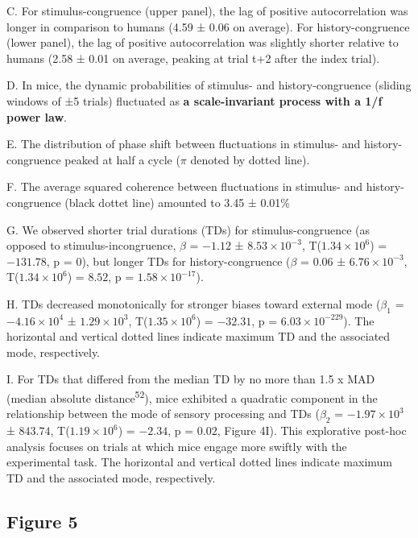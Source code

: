 \documentclass[
]{article}
\begin{document}
C. For stimulus-congruence (upper panel), the lag of positive
autocorrelation was longer in comparison to humans (4.59 ± 0.06 on
average). For history-congruence (lower panel), the lag of positive
autocorrelation was slightly shorter relative to humans (2.58 ± 0.01 on
average, peaking at trial t+2 after the index trial).

D. In mice, the dynamic probabilities of stimulus- and
history-congruence (sliding windows of ±5 trials) fluctuated as
\textbf{a scale-invariant process with a 1/f power law}.

E. The distribution of phase shift between fluctuations in stimulus- and
history-congruence peaked at half a cycle (\(\pi\) denoted by dotted
line).

F. The average squared coherence between fluctuations in stimulus- and
history-congruence (black dottet line) amounted to 3.45 ± 0.01\%

G. We observed shorter trial durations (TDs) for stimulus-congruence (as
opposed to stimulus-incongruence, \(\beta\) = \(-1.12\) ±
\(\ensuremath{8.53\times 10^{-3}}\),
T(\(\ensuremath{1.34\times 10^{6}}\)) = \(-131.78\), p = \(0\)), but
longer TDs for history-congruence (\(\beta\) = \(0.06\) ±
\(\ensuremath{6.76\times 10^{-3}}\),
T(\(\ensuremath{1.34\times 10^{6}}\)) = \(8.52\), p =
\(\ensuremath{1.58\times 10^{-17}}\)).

H. TDs decreased monotonically for stronger biases toward external mode
(\(\beta_1\) = \(\ensuremath{-4.16\times 10^{4}}\) ±
\(\ensuremath{1.29\times 10^{3}}\),
T(\(\ensuremath{1.35\times 10^{6}}\)) = \(-32.31\), p =
\(\ensuremath{6.03\times 10^{-229}}\)). The horizontal and vertical
dotted lines indicate maximum TD and the associated mode, respectively.

I. For TDs that differed from the median TD by no more than 1.5 x MAD
(median absolute distance\textsuperscript{52}), mice exhibited a
quadratic component in the relationship between the mode of sensory
processing and TDs (\(\beta_2\) = \(\ensuremath{-1.97\times 10^{3}}\) ±
\(843.74\), T(\(\ensuremath{1.19\times 10^{6}}\)) = \(-2.34\), p =
\(0.02\), Figure 4I). This explorative post-hoc analysis focuses on
trials at which mice engage more swiftly with the experimental task. The
horizontal and vertical dotted lines indicate maximum TD and the
associated mode, respectively.

\newpage

\hypertarget{figure-5}{%
\subsection{Figure 5}\label{figure-5}}
\end{document}
